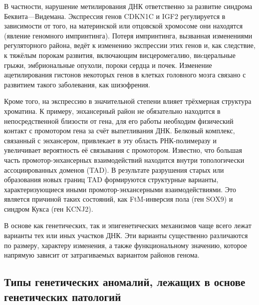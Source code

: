 \documentclass[a4paper,12pt]{article}
\begin{document}
В частности, нарушение метилирования ДНК ответственно за развитие синдрома Беквита---Видемана.
Экспрессия генов CDKN1C и IGF2 регулируется в зависимости от того, на материнской или отцовской хромосоме они находятся (явление геномного импринтинга).
Потеря импринтинга, вызванная изменениями регуляторного района, ведёт к изменению экспрессии этих генов и, как следствие, к тяжёлым порокам развития, включающим висцеромегалию, виcцеральные грыжи, эмбриональные опухоли, пороки сердца и почек\cite{jin}.
Изменение ацетилирования гистонов некоторых генов в клетках головного мозга связано с развитием такого заболевания, как шизофрения\cite{tang}.

Кроме того, на экспрессию в значительной степени влияет трёхмерная структура хроматина.
К примеру, энхансерный район не обязательно находится в непосредственной близости от гена, для его работы необходим физический контакт с промотором гена за счёт выпетливания ДНК.
Белковый комплекс, связанный с энхансером, привлекает в эту область РНК-полимеразу и увеличивает вероятность её связывания с промотором.
Известно, что большая часть промотор-энхансерных взаимодействий находится внутри топологически ассоциированных доменов (TAD).
В результате разрушения старых или образования новых границ TAD формируются структурные варианты, характеризующиеся иными промотор-энхансерными взаимодействиями.
Это является причиной таких состояний, как FtM-инверсия пола (ген SOX9) и синдром Кукса (ген KCNJ2)\cite{spielmann}.

В основе как генетических, так и эпигенетических механизмов чаще всего лежат варианты тех или иных участков ДНК.
Эти варианты существенно различаются по размеру, характеру изменения, а также функциональному значению, которое напрямую зависит от затрагиваемых вариантом районов генома.

\subsection{Типы генетических аномалий, лежащих в основе генетических патологий}
\end{document}
